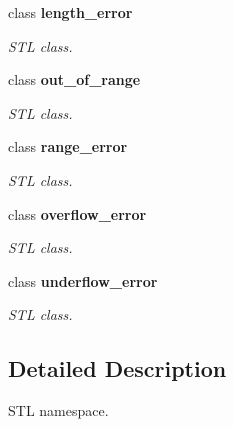 \begin{DoxyCompactItemize}
class {\bfseries length\_\-error}
\begin{DoxyCompactList}\small\item\em STL class. \end{DoxyCompactList}\item 
class {\bfseries out\_\-of\_\-range}
\begin{DoxyCompactList}\small\item\em STL class. \end{DoxyCompactList}\item 
class {\bfseries range\_\-error}
\begin{DoxyCompactList}\small\item\em STL class. \end{DoxyCompactList}\item 
class {\bfseries overflow\_\-error}
\begin{DoxyCompactList}\small\item\em STL class. \end{DoxyCompactList}\item 
class {\bfseries underflow\_\-error}
\begin{DoxyCompactList}\small\item\em STL class. \end{DoxyCompactList}\end{DoxyCompactItemize}


\subsection{Detailed Description}
STL namespace. 